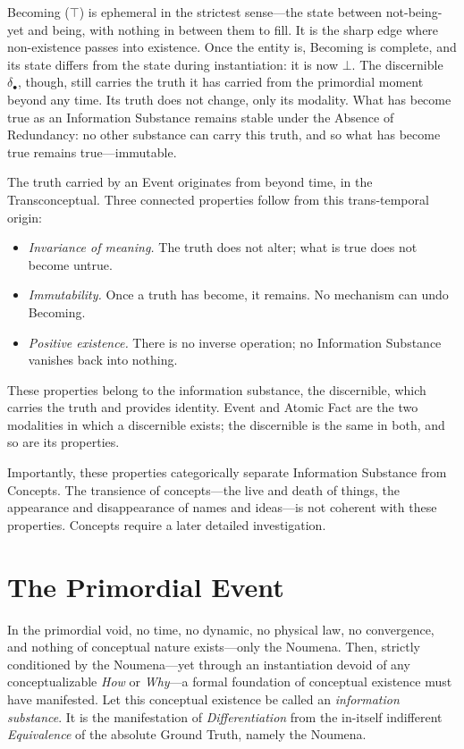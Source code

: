 \documentclass[11pt, a4paper]{article}
\theoremstyle{formalism}
\begin{document}
Becoming ($\top$) is ephemeral in the strictest sense---the state between
not-being-yet and being, with nothing in between them to fill. It is the
sharp edge where non-existence passes into existence. Once the entity is,
Becoming is complete, and its state differs from the state during
instantiation: it is now $\bot$. The discernible $\delta_\bullet$, though,
still carries the truth it has carried from the primordial moment beyond any
time. Its truth does not change, only its modality. What has become true as
an Information Substance remains stable under the Absence of Redundancy: no
other substance can carry this truth, and so what has become true remains
true---immutable.

The truth carried by an Event originates from beyond time, in the
Transconceptual. Three connected properties follow from this trans-temporal
origin:

\begin{itemize}
    \item \textit{Invariance of meaning.} The truth does not alter; what is
    true does not become untrue.
    \item \textit{Immutability.} Once a truth has become, it remains. No
    mechanism can undo Becoming.
    \item \textit{Positive existence.} There is no inverse operation; no
    Information Substance vanishes back into nothing.
\end{itemize}

These properties belong to the information substance, the discernible, which
carries the truth and provides identity. Event and Atomic Fact are the two
modalities in which a discernible exists; the discernible is the same in both,
and so are its properties.

Importantly, these properties categorically separate Information Substance from
Concepts. The transience of concepts---the live and death of things, the
appearance and disappearance of names and ideas---is not coherent with these
properties. Concepts require a later detailed investigation.


\section{The Primordial Event}

In the primordial void, no time, no dynamic, no physical law, no convergence,
and nothing of conceptual nature exists---only the Noumena. Then, strictly
conditioned by the Noumena---yet through an instantiation devoid of any
conceptualizable \textit{How} or \textit{Why}---a formal foundation of
conceptual existence must have manifested. Let this conceptual existence
be called an \textit{information substance}. It is the manifestation 
of \textit{Differentiation} from the in-itself indifferent \textit{Equivalence} 
of the absolute Ground Truth, namely the Noumena.
\end{document}
